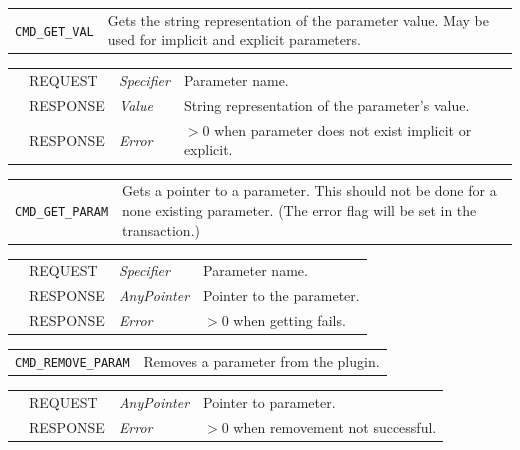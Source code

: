 \vspace{1 cm}

\noindent
\begin{tabularx}{\textwidth}{|p{3.6cm}|X|}
	\cline{1-1}\cline{2-2}
	  \lstinline|CMD_GET_VAL| & Gets the string representation of the parameter value. May be used for implicit and explicit parameters.\\
\end{tabularx}
\begin{tabularx}{\textwidth}{|p{3.6cm}|p{2.3cm}|p{2cm}|X|}
	\cline{1-1}\cline{2-2}\cline{3-3}\cline{4-4}
	  &  REQUEST     &  {\em Specifier}   &  Parameter name.   \\
	\cline{1-1}\cline{2-2}\cline{3-3}\cline{4-4}                        &  RESPONSE    &  {\em Value} &  String representation of the parameter's value.   \\
	\cline{1-1}\cline{2-2}\cline{3-3}\cline{4-4}                        &  RESPONSE    &  {\em Error}  &  $>0$ when parameter does not exist implicit or explicit.   \\
	\hline
\end{tabularx}

\vspace{1 cm}

\noindent
\begin{tabularx}{\textwidth}{|p{3.6cm}|X|}
	\cline{1-1}\cline{2-2}
	  \lstinline|CMD_GET_PARAM| & Gets a pointer to a parameter. This should not be done for a none existing parameter. (The error flag will be set in the transaction.)\\
\end{tabularx}
\begin{tabularx}{\textwidth}{|p{3.6cm}|p{2.3cm}|p{2cm}|X|}
	\cline{1-1}\cline{2-2}\cline{3-3}\cline{4-4}
	   &  REQUEST     &  {\em Specifier}   &  Parameter name.   \\
	\cline{1-1}\cline{2-2}\cline{3-3}\cline{4-4}                        &  RESPONSE    &  {\em AnyPointer} &  Pointer to the parameter.   \\
	\cline{1-1}\cline{2-2}\cline{3-3}\cline{4-4}                        &  RESPONSE    &  {\em Error}  &  $>0$ when getting fails.   \\
	\hline
\end{tabularx}

\vspace{1 cm}

\noindent
\begin{tabularx}{\textwidth}{|p{3.6cm}|X|}
	\cline{1-1}\cline{2-2}
	  \lstinline|CMD_REMOVE_PARAM| & Removes a parameter from the plugin.\\
\end{tabularx}
\begin{tabularx}{\textwidth}{|p{3.6cm}|p{2.3cm}|p{2cm}|X|}
	\cline{1-1}\cline{2-2}\cline{3-3}\cline{4-4}
	   &  REQUEST     &  {\em AnyPointer}   &  Pointer to parameter.   \\
	\cline{1-1}\cline{2-2}\cline{3-3}\cline{4-4}                        &  RESPONSE    &  {\em Error}  &  $>0$ when removement not successful. \\
	\hline
\end{tabularx}

